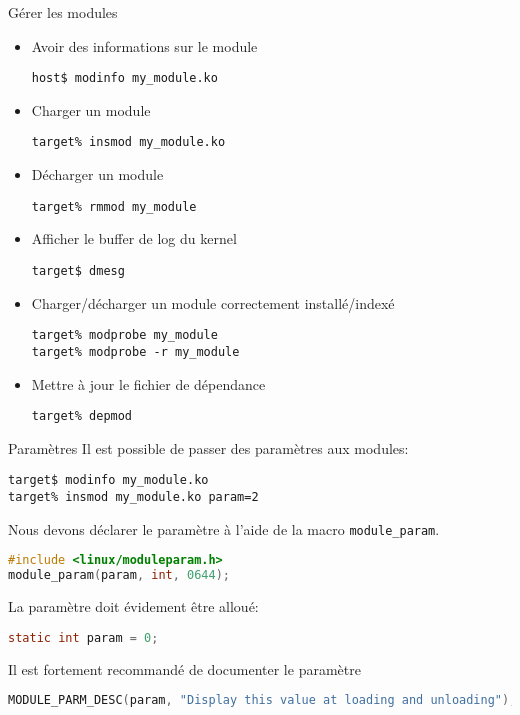 \begin{frame}[fragile=singleslide]{Gérer les modules}
  \begin{itemize} 
  \item Avoir des informations sur le module
    \begin{lstlisting}
host$ modinfo my_module.ko
    \end{lstlisting} %
  \item Charger un module
    \begin{lstlisting}
target% insmod my_module.ko
    \end{lstlisting} %
  \item Décharger un module
    \begin{lstlisting}
target% rmmod my_module
    \end{lstlisting}%
  \item Afficher le buffer de log du kernel
    \begin{lstlisting}
target$ dmesg
    \end{lstlisting} %
  \item Charger/décharger un module correctement installé/indexé
    \begin{lstlisting}
target% modprobe my_module
target% modprobe -r my_module
    \end{lstlisting} %
  \item Mettre à jour le fichier de dépendance
    \begin{lstlisting} 
target% depmod
    \end{lstlisting} %
  \end{itemize}
\end{frame}

\begin{frame}[fragile=singleslide]{Paramètres}
  Il est possible de passer des paramètres aux modules:
  \begin{lstlisting}
target$ modinfo my_module.ko 
target% insmod my_module.ko param=2  
  \end{lstlisting} %
  Nous devons déclarer le paramètre à l'aide de la macro \texttt{module\_param}. 
  \begin{lstlisting}[language=c]
#include <linux/moduleparam.h>
module_param(param, int, 0644);
  \end{lstlisting} 
  La paramètre doit évidement être alloué:
  \begin{lstlisting}[language=c]
static int param = 0;
  \end{lstlisting} 
  Il est fortement recommandé de documenter le paramètre
  \begin{lstlisting}[language=c]
MODULE_PARM_DESC(param, "Display this value at loading and unloading");
  \end{lstlisting} 
\end{frame}

